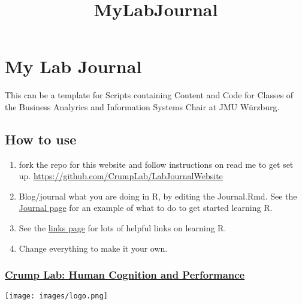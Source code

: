 \documentclass[
]{article}
\title{MyLabJournal}
\author{}
\date{\vspace{-2.5em}}
\begin{document}
\maketitle

\hypertarget{my-lab-journal}{%
\section{\texorpdfstring{\textbf{My Lab
Journal}}{My Lab Journal}}\label{my-lab-journal}}

This can be a template for Scripts containing Content and Code for
Classes of the Business Analyrics and Information Systems Chair at JMU
Würzburg.

\hypertarget{how-to-use}{%
\subsection{How to use}\label{how-to-use}}

\begin{enumerate}
\def\labelenumi{\arabic{enumi}.}
\item
  fork the repo for this website and follow instructions on read me to
  get set up. \url{https://github.com/CrumpLab/LabJournalWebsite}
\item
  Blog/journal what you are doing in R, by editing the Journal.Rmd. See
  the
  \href{https://crumplab.github.io/LabJournalWebsite/Journal.html}{Journal
  page} for an example of what to do to get started learning R.
\item
  See the
  \href{https://crumplab.github.io/LabJournalWebsite/Links.html}{links
  page} for lots of helpful links on learning R.
\item
  Change everything to make it your own.
\end{enumerate}

\hypertarget{crump-lab-human-cognition-and-performance}{%
\subsubsection{\texorpdfstring{\href{https://crumplab.github.io}{Crump
Lab: Human Cognition and
Performance}}{Crump Lab: Human Cognition and Performance}}\label{crump-lab-human-cognition-and-performance}}

\texttt{[image: images/logo.png]}
\end{document}

